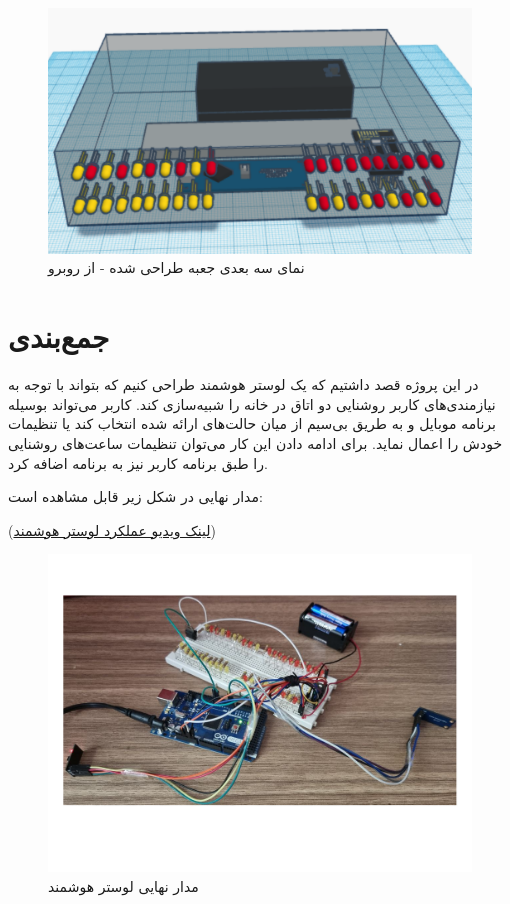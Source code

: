 \documentclass[12pt,a4paper]{article}
\begin{document}
 			\begin{figure}[H]
 			\centering
 			\includegraphics[scale=0.5]{figs/nama-jolo.png}
 			\caption{
 				نمای سه بعدی جعبه طراحی شده - از روبرو
 			}
 			\label{fig:schema13}
 		\end{figure}

	\newpage
\section*{جمع‌بندی}
در این پروژه قصد داشتیم که یک  لوستر هوشمند طراحی کنیم که بتواند با توجه به نیازمندی‌های کاربر روشنایی دو اتاق در خانه را شبیه‌سازی کند. کاربر می‌تواند بوسیله برنامه موبایل و به طریق بی‌سیم از میان حالت‌های ارائه شده انتخاب کند یا تنظیمات خودش را اعمال نماید. برای ادامه دادن این کار می‌توان تنظیمات ساعت‌های روشنایی را طبق برنامه کاربر نیز به برنامه اضافه کرد.

مدار نهایی در شکل زیر قابل مشاهده است:

(\href{https://mega.nz/file/sV8AgRSR#gpizWW71jrvvycUeRTwPTCkDCR79WKKiugmJP3BU1oc}{لینک ویدیو عملکرد لوستر هوشمند})

\begin{figure}[H]
	\centering
	\includegraphics[scale=0.3]{figs/final.png}
	\caption{
		مدار نهایی لوستر هوشمند
	}
	\label{fig:schema14}
\end{figure}
\end{document}

